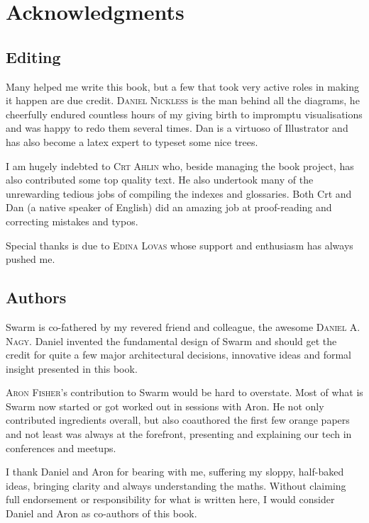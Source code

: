 \newcommand{\person}[1]{{\scshape #1}}
\chapter{Acknowledgments \statusgreen}

\section*{Editing}

Many helped me write this book, but a few that took very active roles in making it happen are due credit. \person{Daniel Nickless} is the man behind all the diagrams, he cheerfully endured countless hours of my giving birth to impromptu visualisations and was happy to redo them several times. Dan is a virtuoso of Illustrator and has also become a latex expert to typeset some nice trees. 

I am hugely indebted to \person{Crt Ahlin} who, beside managing the book project, has also contributed some top quality text.
He also undertook many of the unrewarding tedious jobs of compiling the indexes and glossaries. Both Crt and Dan (a native speaker of English) did an amazing job at proof-reading and correcting mistakes and typos.

Special thanks is due to \person{Edina Lovas} whose support and enthusiasm has always pushed me. 

\section*{Authors}

Swarm is co-fathered by my revered friend and colleague, the awesome \person{Daniel A. Nagy}.  Daniel invented the fundamental design of Swarm and should get the credit for quite a few major architectural decisions, innovative ideas and formal insight presented in this book. 

\person{Aron Fisher}'s contribution to Swarm would be hard to overstate. Most of what is Swarm now started or got worked out in sessions with Aron.  He not only contributed ingredients overall, but also coauthored the first few orange papers and not  least was always at the forefront, presenting and explaining our tech in conferences and meetups.

I thank Daniel and Aron for bearing with me, suffering my sloppy, half-baked ideas, bringing clarity and always understanding the maths.
Without claiming full endorsement or responsibility for what is written here,
I would consider Daniel and Aron as co-authors of this book.

